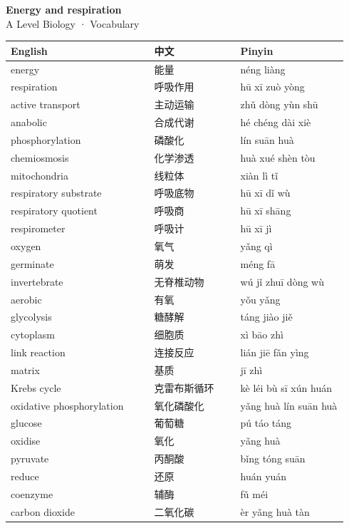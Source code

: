 \documentclass[11pt]{article}
\begin{document}
\begin{center}
  {\LARGE\bfseries Energy and respiration}\\[0.35em]
  {\large A Level Biology · Vocabulary}
\end{center}
\vspace{0.6em}

\begin{longtable}{@{}p{0.40\linewidth}p{0.24\linewidth}p{0.30\linewidth}@{}}
\toprule
\textbf{English} & \textbf{中文} & \textbf{Pinyin} \\
\midrule
\endhead
\bottomrule
\endlastfoot
energy & 能量 & néng liàng \\
respiration & 呼吸作用 & hū xī zuò yòng \\
active transport & 主动运输 & zhǔ dòng yùn shū \\
anabolic & 合成代谢 & hé chéng dài xiè \\
phosphorylation & 磷酸化 & lín suān huà \\
chemiosmosis & 化学渗透 & huà xué shèn tòu \\
mitochondria & 线粒体 & xiàn lì tǐ \\
respiratory substrate & 呼吸底物 & hū xī dǐ wù \\
respiratory quotient & 呼吸商 & hū xī shāng \\
respirometer & 呼吸计 & hū xī jì \\
oxygen & 氧气 & yǎng qì \\
germinate & 萌发 & méng fā \\
invertebrate & 无脊椎动物 & wú jǐ zhuī dòng wù \\
aerobic & 有氧 & yǒu yǎng \\
glycolysis & 糖酵解 & táng jiào jiě \\
cytoplasm & 细胞质 & xì bāo zhì \\
link reaction & 连接反应 & lián jiē fǎn yìng \\
matrix & 基质 & jī zhì \\
Krebs cycle & 克雷布斯循环 & kè léi bù sī xún huán \\
oxidative phosphorylation & 氧化磷酸化 & yǎng huà lín suān huà \\
glucose & 葡萄糖 & pú táo táng \\
oxidise & 氧化 & yǎng huà \\
pyruvate & 丙酮酸 & bǐng tóng suān \\
reduce & 还原 & huán yuán \\
coenzyme & 辅酶 & fǔ méi \\
carbon dioxide & 二氧化碳 & èr yǎng huà tàn \\

\end{longtable}
\end{document}
